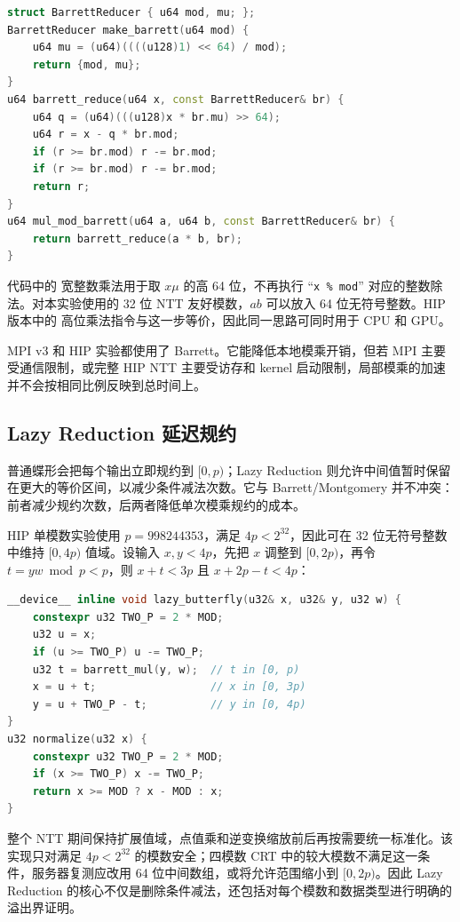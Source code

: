 \begin{lstlisting}[title=Barrett 规约与模乘,label={lst:barrett-reduce},language={C++}]
struct BarrettReducer { u64 mod, mu; };
BarrettReducer make_barrett(u64 mod) {
    u64 mu = (u64)((((u128)1) << 64) / mod);
    return {mod, mu};
}
u64 barrett_reduce(u64 x, const BarrettReducer& br) {
    u64 q = (u64)(((u128)x * br.mu) >> 64);
    u64 r = x - q * br.mod;
    if (r >= br.mod) r -= br.mod;
    if (r >= br.mod) r -= br.mod;
    return r;
}
u64 mul_mod_barrett(u64 a, u64 b, const BarrettReducer& br) {
    return barrett_reduce(a * b, br);
}
\end{lstlisting}

代码中的 宽整数乘法用于取 $x\mu$ 的高 64 位，不再执行 “\texttt{x \% mod}” 对应的整数除法。对本实验使用的 32 位 NTT 友好模数，$ab$ 可以放入 64 位无符号整数。HIP 版本中的 高位乘法指令与这一步等价，因此同一思路可同时用于 CPU 和 GPU。

MPI v3 和 HIP 实验都使用了 Barrett。它能降低本地模乘开销，但若 MPI 主要受通信限制，或完整 HIP NTT 主要受访存和 kernel 启动限制，局部模乘的加速并不会按相同比例反映到总时间上。

\subsection{Lazy Reduction 延迟规约}\newwork

普通蝶形会把每个输出立即规约到 $[0,p)$；Lazy Reduction 则允许中间值暂时保留在更大的等价区间，以减少条件减法次数。它与 Barrett/Montgomery 并不冲突：前者减少规约次数，后两者降低单次模乘规约的成本。

HIP 单模数实验使用 $p=998244353$，满足 $4p<2^{32}$，因此可在 32 位无符号整数中维持 $[0,4p)$ 值域。设输入 $x,y<4p$，先把 $x$ 调整到 $[0,2p)$，再令 $t=yw\bmod p<p$，则 $x+t<3p$ 且 $x+2p-t<4p$：

\begin{lstlisting}[title=适用于998244353的Lazy蝶形,label={lst:lazy-butterfly},language={C++}]
__device__ inline void lazy_butterfly(u32& x, u32& y, u32 w) {
    constexpr u32 TWO_P = 2 * MOD;
    u32 u = x;
    if (u >= TWO_P) u -= TWO_P;
    u32 t = barrett_mul(y, w);  // t in [0, p)
    x = u + t;                  // x in [0, 3p)
    y = u + TWO_P - t;          // y in [0, 4p)
}
u32 normalize(u32 x) {
    constexpr u32 TWO_P = 2 * MOD;
    if (x >= TWO_P) x -= TWO_P;
    return x >= MOD ? x - MOD : x;
}
\end{lstlisting}

整个 NTT 期间保持扩展值域，点值乘和逆变换缩放前后再按需要统一标准化。该实现只对满足 $4p<2^{32}$ 的模数安全；四模数 CRT 中的较大模数不满足这一条件，服务器复测应改用 64 位中间数组，或将允许范围缩小到 $[0,2p)$。因此 Lazy Reduction 的核心不仅是删除条件减法，还包括对每个模数和数据类型进行明确的溢出界证明。

